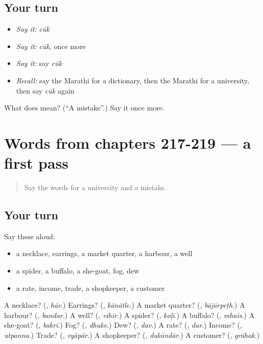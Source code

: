 \subsection*{Your turn}
\begin{itemize}
\raggedright
  \item \emph{Say it:} \emph{cūk}
  \item \emph{Say it:} \emph{cūk}, once more
  \item \emph{Say it:} say \emph{cūk}
  \item \emph{Recall:} say the Marathi for a dictionary, then the Marathi for a university, then say \emph{cūk} again
\end{itemize}

\begin{tcolorbox}[breakable,colback=teal!4,colframe=teal!35!black,title={Before you move on}]
What does  mean? (\textquotedblleft{}A mistake\textquotedblright{}.) Say it once more.
\end{tcolorbox}
\section[(dialogue)]{Words from chapters 217-219 — a first pass}

\label{lesson:MR-R222-first-pass-words-from-chapters-217-219}



\begin{quote}
Say the words for a university and a mistake.
\end{quote}

\subsection*{Your turn}
Say these aloud:

\begin{itemize}
\raggedright
  \item a necklace, earrings, a market quarter, a harbour, a well
  \item a spider, a buffalo, a she-goat, fog, dew
  \item a rate, income, trade, a shopkeeper, a customer
\end{itemize}

\begin{tcolorbox}[breakable,colback=teal!4,colframe=teal!35!black,title={Before you move on}]
A necklace? (\textbf{}, \emph{hār}.) Earrings? (\textbf{}, \emph{kānātle}.) A market quarter? (\textbf{}, \emph{bājārpeṭh}.) A harbour? (\textbf{}, \emph{bandar}.) A well? (\textbf{}, \emph{vihīr}.) A spider? (\textbf{}, \emph{koḷī}.) A buffalo? (\textbf{}, \emph{mhais}.) A she-goat? (\textbf{}, \emph{bakrī}.) Fog? (\textbf{}, \emph{dhuke}.) Dew? (\textbf{}, \emph{dav}.) A rate? (\textbf{}, \emph{dar}.) Income? (\textbf{}, \emph{utpanna}.) Trade? (\textbf{}, \emph{vyāpār}.) A shopkeeper? (\textbf{}, \emph{dukāndār}.) A customer? (\textbf{}, \emph{grāhak}.)
\end{tcolorbox}
